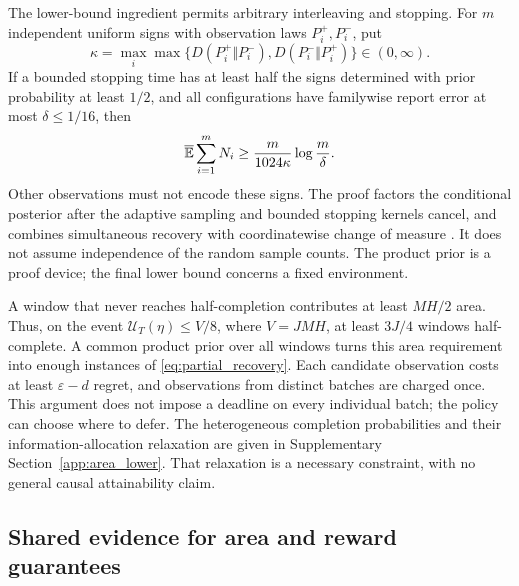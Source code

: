 \documentclass[11pt]{article}
\begin{document}
The lower-bound ingredient permits arbitrary interleaving and stopping. For
$m$ independent uniform signs with observation laws $P_i^+,P_i^-$, put
\[
 \kappa=\max_i\max\{D(P_i^+\Vert P_i^-),D(P_i^-\Vert P_i^+)\}
                                                    \in(0,\infty).
\]
If a bounded stopping time has at least half the signs determined with prior
probability at least $1/2$, and all configurations have familywise report
error at most $\delta\le1/16$, then
\begin{equation}
 \overline{\mathbb E}\sum_{i=1}^mN_i\ge
                 \frac{m}{1024\kappa}\log\frac m\delta.
 \label{eq:partial_recovery}
\end{equation}
Other observations must not encode these signs. The proof factors the
conditional posterior after the adaptive sampling and bounded stopping
kernels cancel, and combines simultaneous recovery with coordinatewise
change of measure \citep{kaufmann2016}. It does not assume independence of
the random sample counts. The product prior is a proof device; the final
lower bound concerns a fixed environment.

A window that never reaches half-completion contributes at least $MH/2$
area. Thus, on the event $\mathcal U_T(\eta)\le V/8$, where $V=JMH$, at
least $3J/4$ windows half-complete. A common product prior over all windows
turns this area requirement into enough instances of
\eqref{eq:partial_recovery}. Each candidate observation costs at least
$\varepsilon-d$ regret, and observations from distinct batches are charged
once. This argument does not impose a deadline on every individual batch;
the policy can choose where to defer. The heterogeneous completion
probabilities and their information-allocation relaxation are given in
Supplementary Section~\ref{app:area_lower}. That relaxation is a necessary
constraint, with no general causal attainability claim.

\subsection{Shared evidence for area and reward guarantees}
\end{document}
